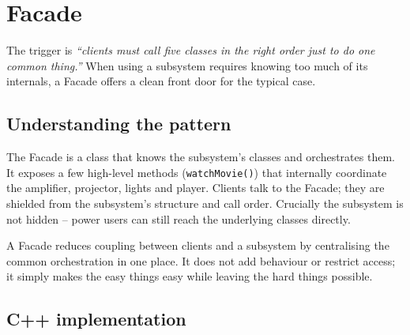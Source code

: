 \section{Facade}
\label{sec:pat-facade}


\begin{patternbox}
The trigger is \emph{``clients must call five classes in the right order
just to do one common thing.''} When using a subsystem requires knowing
too much of its internals, a Facade offers a clean front door for the
typical case.
\end{patternbox}

\subsection*{Understanding the pattern}

The Facade is a class that knows the subsystem's classes and orchestrates
them. It exposes a few high-level methods (\texttt{watchMovie()}) that
internally coordinate the amplifier, projector, lights and player. Clients
talk to the Facade; they are shielded from the subsystem's structure and
call order. Crucially the subsystem is not hidden -- power users can still
reach the underlying classes directly.

\begin{ideabox}
A Facade reduces coupling between clients and a subsystem by centralising
the common orchestration in one place. It does not add behaviour or
restrict access; it simply makes the easy things easy while leaving the
hard things possible.
\end{ideabox}

\subsection*{C++ implementation}

